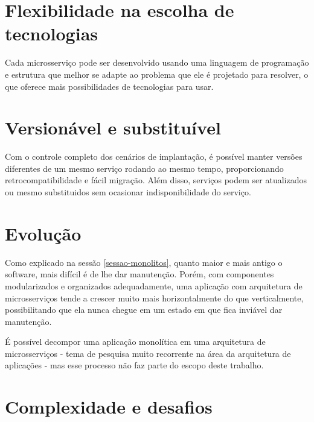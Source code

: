 \section{Flexibilidade na escolha de tecnologias}

Cada microsserviço pode ser desenvolvido usando uma linguagem de programação e estrutura que melhor se adapte ao problema que ele é projetado para resolver, o que oferece mais possibilidades de tecnologias para usar. \cite{oracle_microservices}

\section{Versionável e substituível}

Com o controle completo dos cenários de implantação, é possível manter versões diferentes de um mesmo serviço rodando ao mesmo tempo, proporcionando retrocompatibilidade e fácil migração. Além disso, serviços podem ser atualizados ou mesmo substituidos sem ocasionar indisponibilidade do serviço. \cite{Familiar2015}

\section{Evolução}

Como explicado na sessão \autoref{sessao-monolitos}, quanto maior e mais antigo o software, mais difícil é de lhe dar manutenção. Porém, com componentes modularizados e organizados adequadamente, uma aplicação com arquitetura de microsserviços tende a crescer muito mais horizontalmente do que verticalmente, possibilitando que ela nunca chegue em um estado em que fica inviável dar manutenção. 

É possível decompor uma aplicação monolítica em uma arquitetura de microsserviços - tema de pesquisa muito recorrente na área da arquitetura de aplicações - mas esse processo não faz parte do escopo deste trabalho.


\section{Complexidade e desafios}

